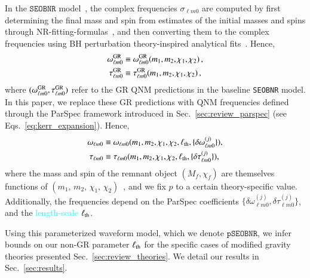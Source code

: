 \documentclass[twocolumn,
               prd,
               aps,
               superscriptaddress,
               tightenlines,
               nofootinbib,
               eqsecnum,
               amsfonts,
               amsmath,
               longbibliography]{revtex4-1}
\newcommand{\pSEOB}{\texttt{pSEOBNR}}
\newcommand{\SEOB}{\texttt{SEOBNR}}
\newcommand{\hs}[1]{{\textcolor{blue}{{[HS: #1]}} }}
\newcommand{\ab}[1]{{\textcolor{cyan}{{#1}} }}
\begin{document}
In the $\SEOB$ model~\cite{Bohe:2016gbl,Cotesta:2018fcv}, the complex frequencies
$\sigma_{\ell m 0}$ are computed by first determining the final mass and spin from
estimates of the initial masses and spins through NR-fitting-formulas~\cite{Taracchini:2013rva,Hofmann:2016yih}, 
and then converting them to the complex frequencies using BH perturbation
theory-inspired analytical fits~\cite{Berti:2005ys,Berti:2009kk}.
%
Hence,
%
\begin{subequations}
\begin{align}
\omega_{\ell m 0}^{\rm GR} &\equiv \omega^{\rm GR}_{\ell m 0}(m_1, m_2, \chi_1, \chi_2)\,,
\\
\tau _{\ell m 0}^{\rm GR} & \equiv \tau^{\rm GR}_{\ell m 0}(m_1, m_2, \chi_1, \chi_2)\,,
\end{align}
\end{subequations}
%
where $(\omega^{\rm GR}_{\ell m 0}, \tau^{\rm GR}_{\ell m 0})$ refer to the GR QNM predictions in the baseline \SEOB{} model. 
In this paper, we replace these GR predictions with QNM
frequencies defined through the ParSpec framework introduced in
Sec.~\ref{sec:review_parspec} (see Eqs.~\eqref{eq:kerr_expansion}). Hence,
%
\begin{subequations}
\begin{align}
\omega_{\ell m 0} & \equiv  \omega_{\ell m 0}(m_1, m_2, \chi_1, \chi_2,\ell_{\rm th}, \{\delta \omega_{\ell m 0}^{(j)}\}),\\
\tau_{\ell m 0}   & \equiv \tau_{\ell m 0} (m_1, m_2, \chi_1, \chi_2, \ell_{\rm th}, \{\delta \tau_{\ell m 0}^{(j)}\}),
\end{align}
\end{subequations}
%
where the mass and spin of the remnant object $(M_f,\chi_f)$ are themselves functions of
$(m_1,\, m_2,\, \chi_1,\, \chi_2)$~\cite{Taracchini:2013rva,Hofmann:2016yih}, and we fix $p$
to a certain theory-specific value. Additionally,  the frequencies depend on the ParSpec coefficients $\{\delta
\omega_{\ell m 0}^{(j)},\delta \tau_{\ell m 0}^{(j)}\}$,  and the \ab{length-scale} $\ell_{\rm th}$.

Using this parameterized waveform model, which we denote $\pSEOB$, 
we infer bounds on our non-GR parameter $\ell_{\rm th}$ for the specific cases of
modified gravity theories presented Sec.~\ref{sec:review_theories}.
%
We detail our results in Sec.~\ref{sec:results}.
%
%
%
\end{document}
